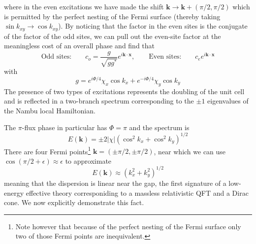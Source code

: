 \documentclass{report}
\begin{document}
where in the even excitations we have made the shift $ \mathbf{k} \rightarrow \mathbf{k} 
+ (\pi/2,\pi/2)$ which is permitted by the perfect nesting of the Fermi surface 
(thereby taking $ \sin k_{xy} \rightarrow \cos k_{xy} $). 
By noticing that the factor in the even sites is the conjugate of the factor 
of the odd sites, we can pull out the even-site factor at the
meaningless cost of an overall phase and find that 
\begin{equation}
	\text{Odd sites:} \qquad c_o  =\frac{g}{\sqrt{gg^\ast}} e^{i \mathbf{k}\cdot \mathbf{x}},
	\qquad \text{Even sites:} \qquad c_e e^{i \mathbf{k}\cdot \mathbf{x}}
	\label{eq:heisenberg-qed3-excitations}
\end{equation}
with 
\begin{equation*}
	g = e^{i\Phi/4}\chi_x \cos k_x + e^{-i\Phi/4} \chi_y \cos k_y 
\end{equation*}
The presence of two types of excitations represents the doubling of the unit cell
and is reflected in a two-branch spectrum corresponding to the $ \pm 1$
eigenvalues of the Nambu local Hamiltonian. 

The $ \pi $-flux phase in particular has $ \Phi = \pi $ and the spectrum is 
\begin{equation*}
	E(\mathbf{k}) =\pm 2 |\chi| \left(\cos^2 k_x + \cos^2k_y\right)^{1/2}
\end{equation*}
There are four Fermi points\footnote{Note however that because of the perfect
nesting of the Fermi surface only two of those Fermi points are inequivalent.} $
\mathbf{k} = (\pm \pi/ 2,\pm \pi/2) $, near which we can use $ \cos(\pi/2 +
\epsilon) \approx \epsilon$ to approximate
\begin{equation*}
	E(\mathbf{k})\approx 
	\left(
		k_x^2 + k_y^2
	\right)^{1/2}
\end{equation*}
meaning that the dispersion is linear near the gap, the first signature of a 
low-energy effective theory corresponiding to a massless relativistic QFT and 
a Dirac cone. We now explicitly demonstrate this fact.
\end{document}

